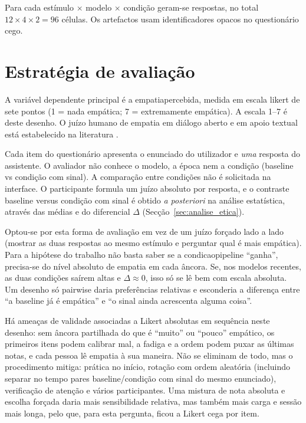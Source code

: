 Para cada estímulo \(\times\) modelo \(\times\) condição geram-se respostas, no total \(12 \times 4 \times 2 = 96\) células. Os artefactos usam identificadores opacos no questionário cego.


\section{Estratégia de avaliação}
\label{sec:avaliacao}

A variável dependente principal é a \gls{empatiapercebida}, medida em escala \gls{likert} de sete pontos (1 = nada empática; 7 = extremamente empática). A escala 1--7 é deste desenho. O juízo humano de empatia em diálogo aberto e em apoio textual está estabelecido na literatura \parencite{Rashkin2019Empathy, Sharma2020Empathy}.

Cada item do questionário apresenta o enunciado do utilizador e \textit{uma} resposta do assistente. O avaliador não conhece o modelo, a época nem a condição (baseline vs condição com sinal). A comparação entre condições não é solicitada na interface. O participante formula um juízo absoluto por resposta, e o contraste baseline versus condição com sinal é obtido \textit{a posteriori} na análise estatística, através das médias e do diferencial \(\Delta\) (Secção~\ref{sec:analise_etica}).

Optou-se por esta forma de avaliação em vez de um juízo forçado lado a lado (mostrar as duas respostas ao mesmo estímulo e perguntar qual é mais empática). Para a hipótese do trabalho não basta saber se a \gls{condicaopipeline} ``ganha'', precisa-se do nível absoluto de empatia em cada âncora. Se, nos modelos recentes, as duas condições saírem altas e \(\Delta \approx 0\), isso só se lê bem com escala absoluta. Um desenho só pairwise daria preferências relativas e esconderia a diferença entre ``a \gls{baseline} já é empática'' e ``o sinal ainda acrescenta alguma coisa''.

Há ameaças de validade associadas a Likert absolutas em sequência neste desenho: sem âncora partilhada do que é ``muito'' ou ``pouco'' empático, os primeiros itens podem calibrar mal, a fadiga e a ordem podem puxar as últimas notas, e cada pessoa lê empatia à sua maneira. Não se eliminam de todo, mas o procedimento mitiga: prática no início, rotação com ordem aleatória (incluindo separar no tempo pares baseline/condição com sinal do mesmo enunciado), verificação de atenção e vários participantes. Uma mistura de nota absoluta e escolha forçada daria mais sensibilidade relativa, mas também mais carga e sessão mais longa, pelo que, para esta pergunta, ficou a Likert cega por item.

